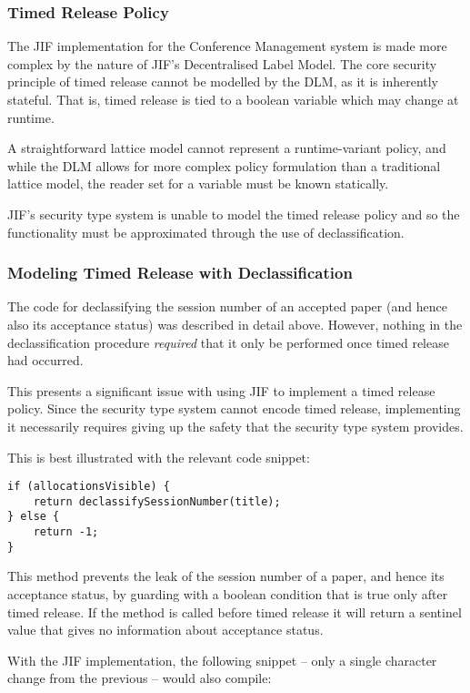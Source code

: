\subsubsection{Timed Release Policy}

The JIF implementation for the Conference Management system is made more complex by the nature of JIF's Decentralised Label Model. The core security principle of timed release cannot be modelled by the DLM, as it is inherently stateful. That is, timed release is tied to a boolean variable which may change at runtime.

A straightforward lattice model cannot represent a runtime-variant policy, and while the DLM allows for more complex policy formulation than a traditional lattice model, the reader set for a variable must be known statically.

JIF's security type system is unable to model the timed release policy and so the functionality must be approximated through the use of declassification.

\subsubsection{Modeling Timed Release with Declassification}

The code for declassifying the session number of an accepted paper (and hence also its acceptance status) was described in detail above. However, nothing in the declassification procedure \textit{required} that it only be performed once timed release had occurred.

This presents a significant issue with using JIF to implement a timed release policy. Since the security type system cannot encode timed release, implementing it necessarily requires giving up the safety that the security type system provides.

This is best illustrated with the relevant code snippet:

\begin{verbatim}
if (allocationsVisible) {
	return declassifySessionNumber(title);
} else {
	return -1;
}
\end{verbatim}

This method prevents the leak of the session number of a paper, and hence its acceptance status, by guarding with a boolean condition that is true only after timed release. If the method is called before timed release it will return a sentinel value that gives no information about acceptance status.

With the JIF implementation, the following snippet -- only a single character change from the previous -- would also compile:

